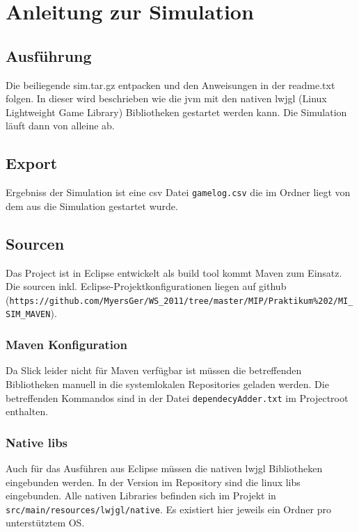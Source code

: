 \documentclass[10pt]{scrartcl}
\author{André Harms, Oliver Steenbuck, Armin Steudte  \\ Carsten Noetzel, Dennis Blauhut, Torben Becker}
\title{\titletext}
\date{11.01.2012}
\begin{document}
\maketitle

\setcounter{tocdepth}{3}
\tableofcontents

	\listoftables                                 												%
	\listoffigures   

\section{Anleitung zur Simulation}

\subsection{Ausführung}
Die beiliegende sim.tar.gz entpacken und den Anweisungen in der readme.txt folgen.
In dieser wird beschrieben wie die jvm mit den nativen lwjgl (Linux Lightweight Game Library) Bibliotheken gestartet werden kann. Die Simulation läuft dann von alleine ab.
\subsection{Export}
Ergebniss der Simulation ist eine csv Datei \verb!gamelog.csv! die im Ordner liegt von dem aus die Simulation gestartet wurde.


\subsection{Sourcen}
Das Project ist in Eclipse entwickelt als build tool kommt Maven zum Einsatz. Die sourcen inkl. Eclipse-Projektkonfigurationen liegen auf github (\verb!https://github.com/MyersGer/WS_2011/tree/master/MIP/Praktikum%202/MI_SIM_MAVEN!).

\subsubsection{Maven Konfiguration}
Da Slick leider nicht für Maven verfügbar ist müssen die betreffenden Bibliotheken manuell in die systemlokalen Repositories geladen werden. Die betreffenden Kommandos sind in der Datei \verb!dependecyAdder.txt! im Projectroot enthalten.

\subsubsection{Native libs}
Auch für das Ausführen aus Eclipse müssen die nativen lwjgl Bibliotheken eingebunden werden. In der Version im Repository sind die linux libs eingebunden. Alle nativen Libraries befinden sich im Projekt in \verb!src/main/resources/lwjgl/native!. Es existiert hier jeweils ein Ordner pro unterstütztem OS.
\end{document}
